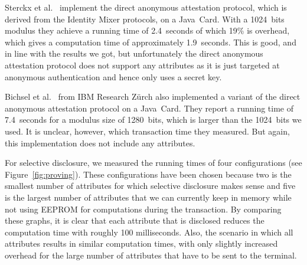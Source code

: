 Sterckx et al.~\cite{Sterckx09} implement the direct anonymous attestation
protocol, which is derived from the Identity Mixer protocols, on a Java~Card.
With a 1024~bits modulus they achieve a running time of 2.4~seconds of which
19\% is overhead, which gives a computation time of approximately 1.9~seconds.
This is good, and in line with the results we got, but unfortunately the direct
anonymous attestation protocol does not support any attributes as it is just
targeted at anonymous authentication and hence only uses a secret key.

Bichsel et al.~\cite{BichselCGS2009} from IBM Research Z\"urch also implemented
a variant of the direct anonymous attestation protocol on a Java~Card. They
report a running time of 7.4~seconds for a modulus size of 1280~bits, which is
larger than the 1024~bits we used. It is unclear, however, which transaction
time they measured. But again, this implementation does not include any
attributes.

For selective disclosure, we measured the running times of four configurations
(see Figure~\ref{fig:proving}). These configurations have been chosen because
two is the smallest number of attributes for which selective disclosure makes
sense and five is the largest number of attributes that we can currently keep in
memory while not using EEPROM for computations during the transaction. By
comparing these graphs, it is clear that each attribute that is disclosed
reduces the computation time with roughly 100 milliseconds. Also, the scenario
in which all attributes results in similar computation times, with only slightly
increased overhead for the large number of attributes that have to be sent to
the terminal.


